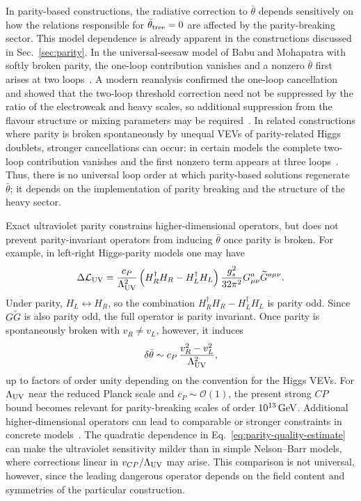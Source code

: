 \documentclass[review]{elsarticle}
\numberwithin{equation}{section}
\numberwithin{table}{section}
\numberwithin{figure}{section}
\begin{document}
In parity-based constructions, the radiative correction to $\bar\theta$ depends sensitively on how the relations responsible for $\bar\theta_{\rm tree}=0$ are affected by the parity-breaking sector. This model dependence is already apparent in the constructions discussed in Sec.~\ref{sec:parity}. In the universal-seesaw model of Babu and Mohapatra with softly broken parity, the one-loop contribution vanishes and a nonzero $\bar\theta$ first arises at two loops~\cite{Babu:1989rb}. A modern reanalysis confirmed the one-loop cancellation and showed that the two-loop threshold correction need not be suppressed by the ratio of the electroweak and heavy scales, so additional suppression from the flavour structure or mixing parameters may be required~\cite{deVries:2021pzl}. In related constructions where parity is broken spontaneously by unequal VEVs of parity-related Higgs doublets, stronger cancellations can occur: in certain models the complete two-loop contribution vanishes and the first nonzero term appears at three loops~\cite{Hall:2018let,Craig:2020bnv,Hisano:2023izx}. Thus, there is no universal loop order at which parity-based solutions regenerate $\bar\theta$; it depends on the implementation of parity breaking and the structure of the heavy sector.

Exact ultraviolet parity constrains higher-dimensional operators, but does not prevent parity-invariant operators from inducing $\bar\theta$ once parity is broken. For example, in left-right Higgs-parity models one may have~\cite{Hall:2018let,Craig:2020bnv}
\begin{align}
    \Delta\mathcal{L}_{\rm UV}
    =
    \frac{c_P}{\Lambda_{\rm UV}^2}
    \left(H_R^\dagger H_R - H_L^\dagger H_L\right)
    \frac{g_s^2}{32\pi^2} G^a_{\mu\nu}\widetilde G^{a\mu\nu}.
    \label{eq:parity-higher-dimensional}
\end{align}
Under parity, $H_L\leftrightarrow H_R$, so the combination $H_R^\dagger H_R-H_L^\dagger H_L$ is parity odd. Since $G\widetilde G$ is also parity odd, the full operator is parity invariant. Once parity is spontaneously broken with $v_R\neq v_L$, however, it induces
\begin{align}
    \delta\bar\theta \sim c_P\, \frac{v_R^2-v_L^2}{\Lambda_{\rm UV}^2},
    \label{eq:parity-quality-estimate}
\end{align}
up to factors of order unity depending on the convention for the Higgs VEVs. For $\Lambda_{\rm UV}$ near the reduced Planck scale and $c_P\sim\mathcal{O}(1)$, the present strong $CP$ bound becomes relevant for parity-breaking scales of order $10^{13}\,{\rm GeV}$. Additional higher-dimensional operators can lead to comparable or stronger constraints in concrete models~\cite{Carrasco-Martinez:2023nit}. The quadratic dependence in Eq.~\eqref{eq:parity-quality-estimate} can make the ultraviolet sensitivity milder than in simple Nelson--Barr models, where corrections linear in $v_{CP}/\Lambda_{\rm UV}$ may arise. This comparison is not universal, however, since the leading dangerous operator depends on the field content and symmetries of the particular construction.
\end{document}

